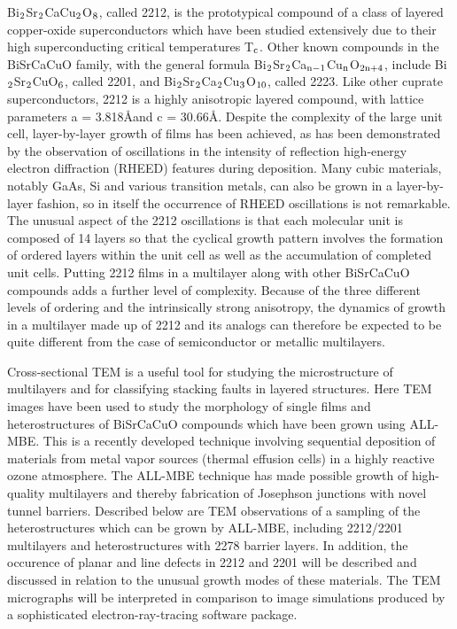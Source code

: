 Bi$\rm _2$Sr$\rm _2$CaCu$\rm _2$O$\rm _8$, called 2212, is the
prototypical compound of a class of layered copper-oxide
superconductors which have been studied extensively due to their high
superconducting critical temperatures T$\rm _c$.  Other known
compounds in the BiSrCaCuO family, with the general formula Bi$\rm
_2$Sr$\rm _2$Ca$\rm _{n-1}$Cu$\rm _n$O$\rm _{2n+4}$, include Bi$\rm
_2$Sr$\rm _2$CuO$\rm _6$, called 2201, and Bi$\rm _2$Sr$\rm _2$Ca$\rm
_2$Cu$\rm_3$O$\rm _{10}$, called 2223.  Like other cuprate
superconductors, 2212 is a highly anisotropic layered compound, with
lattice parameters a = 3.818\AA and c =
30.66\AA.\cite{torrance,sunshine} Despite the complexity of the large
unit cell, layer-by-layer growth of films has been achieved, as has
been demonstrated by the observation of oscillations in the intensity
of reflection high-energy electron diffraction (RHEED) features during
deposition.\cite{sakai} Many cubic materials, notably GaAs, Si and
various transition metals, can also be grown in a layer-by-layer
fashion, so in itself the occurrence of RHEED oscillations is not
remarkable.  The unusual aspect of the 2212 oscillations is that each
molecular unit is composed of 14 layers so that the cyclical growth
pattern involves the formation of ordered layers within the unit cell
as well as the accumulation of completed unit cells.  Putting 2212
films in a multilayer along with other BiSrCaCuO compounds adds a
further level of complexity.  Because of the three different levels of
ordering and the intrinsically strong anisotropy, the dynamics of
growth in a multilayer made up of 2212 and its analogs can therefore
be expected to be quite different from the case of semiconductor or
metallic multilayers.

Cross-sectional TEM is a useful tool for studying the microstructure
of multilayers and for classifying stacking faults in layered
structures.  Here TEM images have been used to study the morphology of
single films and heterostructures of BiSrCaCuO compounds which have
been grown using ALL-MBE.  This is a recently developed technique
involving sequential deposition of materials from metal vapor sources
(thermal effusion cells) in a highly reactive ozone
atmosphere.\cite{eckstein} The ALL-MBE technique has made possible
growth of high-quality multilayers and thereby fabrication of
Josephson junctions with novel tunnel
barriers.\cite{eckstein,eckstein2,bozovic} Described below are TEM
observations of a sampling of the heterostructures which can be grown
by ALL-MBE, including 2212/2201 multilayers and heterostructures with
2278 barrier layers.  In addition, the occurence of planar and line
defects in 2212 and 2201 will be described and discussed in relation
to the unusual growth modes of these materials.  The TEM micrographs
will be interpreted in comparison to image simulations produced by a
sophisticated electron-ray-tracing software package.


